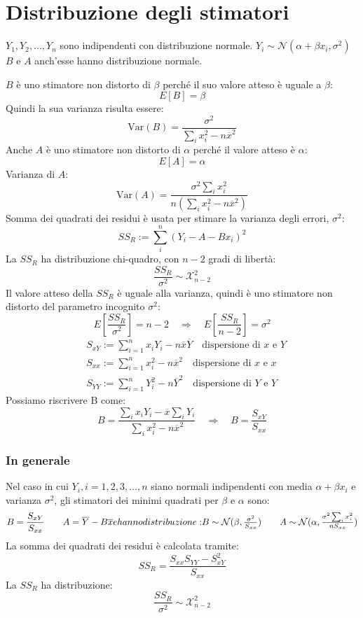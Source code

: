 \documentclass[]{article}
\begin{document}
    \section{Distribuzione degli stimatori}\label{sec:distribuzione-degli-stimatori}
    $Y_1, Y_2, \ldots, Y_n$ sono indipendenti con distribuzione normale. $Y_i \sim \mathcal N(\alpha + \beta x_i, \sigma^2)$
    $B$ e $A$ anch'esse hanno distribuzione normale.
    
    $B$ è uno stimatore non distorto di $\beta$ perché il suo valore atteso è uguale a $\beta$:
    \[ E[B] = \beta \]
    Quindi la sua varianza risulta essere:
    \[\text{Var}(B) = \frac{\sigma^2}{\sum_i x^2_i -n\overline x^2}\]
    Anche $A$ è uno stimatore non distorto di $\alpha$ perché il valore atteso è $\alpha$:
    \[  E[A] = \alpha \]
    Varianza di $A$:
    \[ \text{Var}(A) = \frac{\sigma^2 \sum_i x_i^2}{n(\sum_i x_i^2 - n \overline x^2)} \]
    Somma dei quadrati dei residui è usata per stimare la varianza degli errori, $\sigma^2$:
    \[ SS_R := \sum_i^n(Y_i - A - Bx_i)^2 \]
    La $SS_R$ ha distribuzione chi-quadro, con $n-2$ gradi di libertà:
    \[ \frac{SS_R}{\sigma^2} \sim \mathcal{X}^2_{n-2} \]
    Il valore atteso della $SS_R$ è uguale alla varianza, quindi è uno stimatore non distorto del parametro incognito $\sigma^2$:
    \[E[\frac{SS_R}{\sigma^2}] = n - 2 \quad \Rightarrow \quad E[\frac{SS_R}{n-2}] = \sigma^2\] 
    \begin{equation*}
        \begin{split}
            &S_{xY} := \sum_{i=1}^n x_i Y_i - n \overline x \overline Y \quad \text{dispersione di $x$ e $Y$}\\
            &S_{xx} := \sum_{i = 1}^{n} x^2_i - n \overline x^2 \quad \text{dispersione di $x$ e $x$}\\
            &S_{YY} := \sum_{i=1}^{n} Y_i^2 - n \overline Y^2 \quad \text{dispersione di $Y$ e $Y$}
        \end{split}
    \end{equation*}
    Possiamo riscrivere B come:
    \[ B = \frac{\sum_ix_iY_i - \overline{x}\sum_i Y_i }{\sum_i x_i^2 - n \overline x^2} \quad \Rightarrow \quad B=\frac{S_{xY}}{S_{xx}}\]
    \subsubsection{In generale}
    Nel caso in cui $Y_i, i = 1,2,3,\ldots,n$  siano normali indipendenti con media $\alpha + \beta x_i$ e varianza $\sigma^2$, gli stimatori dei minimi quadrati per $\beta$ e $\alpha$ sono:
    \[B = \frac{S_{xY}}{S_{xx}} \quad \quad A = \overline Y - B \overline x $$ e hanno distribuzione: $$ B \sim \mathcal N(\beta,\frac{\sigma^2}{S_{xx}}) \quad \quad A \sim \mathcal N(\alpha,\frac{\sigma^2 \sum_ix_i^2}{nS_{xx}}) \]
    La somma dei quadrati dei residui è calcolata tramite:
    \[ SS_R = \frac{S_{xx}S_{YY}- S_{xY}^2}{S_{xx}} \]
    La $SS_R$ ha distribuzione:
    \[ \frac{SS_R}{\sigma^2} \sim \mathcal X^2_{n-2} \]
\end{document}

